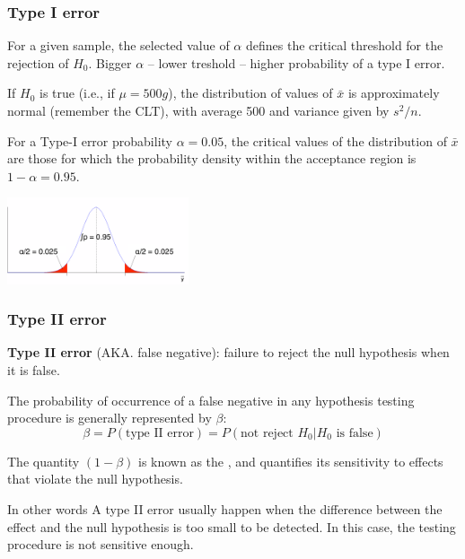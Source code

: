 \documentclass[10pt]{beamer}
\begin{document}
\begin{frame}
  \frametitle{Type I error} 

  \begin{block}{}
  For a given sample, the selected value of $\alpha$ defines the
  critical threshold for the rejection of $H_0$. Bigger $\alpha$ --
  lower treshold -- higher probability of a type I error.
  \end{block}

  \bigskip

  If $H_0$ is true (i.e., if $\mu = 500g$), the distribution of values
  of $\bar{x}$ is approximately normal (remember the CLT), with
  average 500 and variance given by $s^2/n$.

  \bigskip

  For a Type-I error probability $\alpha = 0.05$, the critical values
  of the distribution of $\bar{x}$ are those for which the probability
  density within the acceptance region is $1-\alpha = 0.95$.

  \bigskip
  
  \hfill \includegraphics[width=0.4\textwidth]{img/alpha}
\end{frame}

\begin{frame}
  \frametitle{Type II error}
  \begin{block}{}
    {\bf Type II error} (AKA. false negative): failure to reject the
    null hypothesis when it is false.
  \end{block}

  \bigskip

  The probability of occurrence of a false negative in any hypothesis
  testing procedure is generally represented by $\beta$:
  \begin{equation*}
    \beta = P(\text{type II error}) = P(\text{not reject } H_0|H_0 \text{ is false})
  \end{equation*}

  \bigskip

  The quantity $(1-\beta)$ is known as the , and quantifies its sensitivity to effects that violate the
  null hypothesis.

  \vspace{1cm}

  \begin{exampleblock}{In other words}
    A type II error usually happen when the difference between the
    effect and the null hypothesis is too small to be detected. In
    this case, the testing procedure is not sensitive enough.
  \end{exampleblock}
\end{frame}
\end{document}
